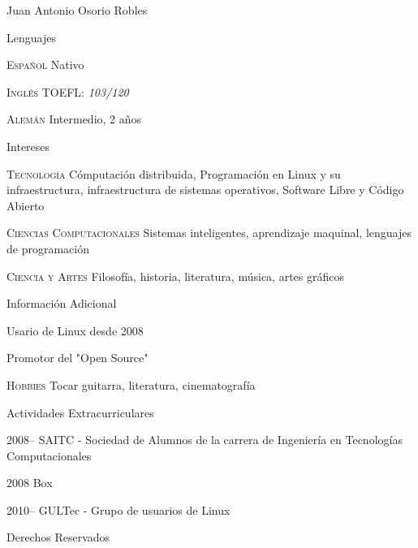 \documentclass[spanish,10pt,letterpaper]{article}
\begin{document}
\begin{cv}{Juan Antonio Osorio Robles}
	\begin{cvlist}{Lenguajes}
		\item [\textsc {Español}]
				Nativo
		\item [\textsc {Inglés}]
				TOEFL: \emph{103/120}
		\item [\textsc {Alemán}]
				Intermedio, 2 años
	\end{cvlist}


	\begin{cvlist}{Intereses}
		\item [\textsc {Tecnología}]
			Cómputación distribuida, Programación en Linux y su infraestructura, infraestructura de sistemas operativos, Software Libre y Código Abierto
		\item [\textsc {Ciencias Computacionales}]
			Sistemas inteligentes, aprendizaje maquinal, lenguajes de programación
		\item [\textsc {Ciencia y Artes}]
			Filosofía, historia, literatura, música, artes gráficos
	\end{cvlist}

	\begin{cvlist}{Información Adicional}
		\item [  ] Usario de Linux desde 2008
		\item [  ] Promotor del "Open Source"
		\item [\textsc {Hobbies}]
				Tocar guitarra, literatura, cinematografía
	\end{cvlist}

	\begin{cvlist}{Actividades Extracurriculares}
		\item [2008--] SAITC - Sociedad de Alumnos de la carrera de Ingeniería en Tecnologías Computacionales
		\item [2008] Box
		\item [2010--] GULTec - Grupo de usuarios de Linux
	\end{cvlist}
	
	\date{{\footnotesize \today}}
	
\end{cv}

\begin{center}
	{\footnotesize Derechos Reservados}
\end{center}

\end{document}
